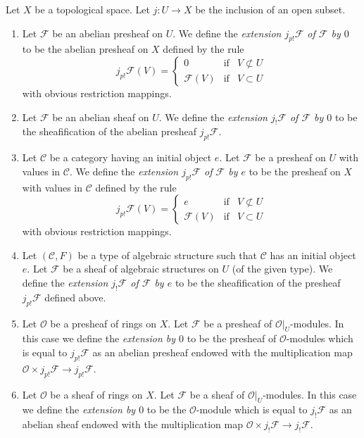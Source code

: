 \begin{definition}
\label{definition-j-shriek-structures}
Let $X$ be a topological space.
Let $j : U \to X$ be the inclusion of an open subset.
\begin{enumerate}
\item Let $\mathcal{F}$ be an abelian presheaf on $U$.
We define the {\it extension $j_{p!}\mathcal{F}$ of $\mathcal{F}$ by $0$}
to be the abelian presheaf on $X$ defined by the rule
$$
j_{p!}\mathcal{F}(V) =
\left\{
\begin{matrix}
0 & \text{if} & V \not \subset U \\
\mathcal{F}(V) & \text{if} & V \subset U
\end{matrix}
\right.
$$
with obvious restriction mappings.
\item Let $\mathcal{F}$ be an abelian sheaf on $U$. We define
the {\it extension $j_!\mathcal{F}$ of $\mathcal{F}$ by $0$}
to be the sheafification of the abelian presheaf $j_{p!}\mathcal{F}$.
\item Let $\mathcal{C}$ be a category having an initial object $e$.
Let $\mathcal{F}$ be a presheaf on $U$ with values in $\mathcal{C}$.
We define the {\it extension $j_{p!}\mathcal{F}$ of $\mathcal{F}$ by $e$}
to be the presheaf on $X$ with values in $\mathcal{C}$ defined by the
rule
$$
j_{p!}\mathcal{F}(V) =
\left\{
\begin{matrix}
e & \text{if} & V \not \subset U \\
\mathcal{F}(V) & \text{if} & V \subset U
\end{matrix}
\right.
$$
with obvious restriction mappings.
\item Let $(\mathcal{C}, F)$ be a type of algebraic structure
such that $\mathcal{C}$ has an initial object $e$.
Let $\mathcal{F}$ be a sheaf of algebraic structures on $U$
(of the given type). We define the
{\it extension $j_!\mathcal{F}$ of $\mathcal{F}$ by $e$}
to be the sheafification of the presheaf $j_{p!}\mathcal{F}$
defined above.
\item Let $\mathcal{O}$ be a presheaf of rings on $X$.
Let $\mathcal{F}$ be a presheaf of $\mathcal{O}|_U$-modules.
In this case we define the {\it extension by $0$}
to be the presheaf of $\mathcal{O}$-modules which is equal to
$j_{p!}\mathcal{F}$ as an abelian presheaf endowed with
the multiplication map
$\mathcal{O} \times j_{p!}\mathcal{F} \to j_{p!}\mathcal{F}$.
\item Let $\mathcal{O}$ be a sheaf of rings on $X$.
Let $\mathcal{F}$ be a sheaf of $\mathcal{O}|_U$-modules.
In this case we define the {\it extension by $0$}
to be the $\mathcal{O}$-module which is equal to
$j_!\mathcal{F}$ as an abelian sheaf endowed with
the multiplication map $\mathcal{O} \times j_!\mathcal{F} \to j_!\mathcal{F}$.
\end{enumerate}
\end{definition}

